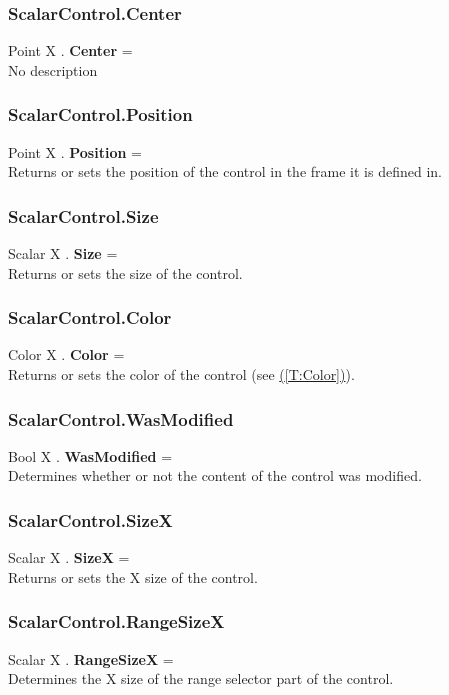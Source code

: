 \documentclass[10pt]{book}
\newcommand{\linkitem}[1]{\hyperref[#1]{\nameref{#1} (\ref{#1})}}
\begin{document}
\subsubsection{ScalarControl.Center \label{F:ScalarControl:Center}}
Point X . \textbf{Center} = \\
No description

\subsubsection{ScalarControl.Position \label{F:ScalarControl:Position}}
Point X . \textbf{Position} = \\
Returns or sets the position of the control in the frame it is defined in.

\subsubsection{ScalarControl.Size \label{F:ScalarControl:Size}}
Scalar X . \textbf{Size} = \\
Returns or sets the size of the control.

\subsubsection{ScalarControl.Color \label{F:ScalarControl:Color}}
Color X . \textbf{Color} = \\
Returns or sets the color of the control (see \linkitem{T:Color}).

\subsubsection{ScalarControl.WasModified \label{F:ScalarControl:WasModified}}
Bool X . \textbf{WasModified} = \\
Determines whether or not the content of the control was modified.

\subsubsection{ScalarControl.SizeX \label{F:ScalarControl:SizeX}}
Scalar X . \textbf{SizeX} = \\
Returns or sets the X size of the control.

\subsubsection{ScalarControl.RangeSizeX \label{F:ScalarControl:RangeSizeX}}
Scalar X . \textbf{RangeSizeX} = \\
Determines the X size of the range selector part of the control.
\end{document}
